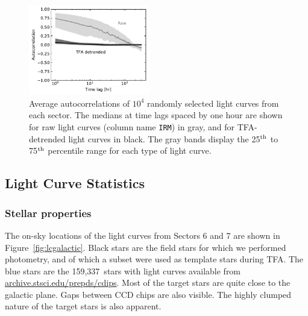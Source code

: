 \documentclass[12pt,twocolumn,tighten]{aastex62}
\newcommand{\numberlcs}{159{,}337\ } %
\newcommand{\stscilink}{\url{archive.stsci.edu/prepds/cdips}}
\begin{document}
\begin{figure}[!t]
	\begin{center}
		\leavevmode
		\includegraphics[width=0.47\textwidth]{avg_acf.pdf}
	\end{center}
	\vspace{-0.5cm}
  \caption{
    Average autocorrelations of $10^4$ randomly selected light curves
    from each sector.  The medians at time lags spaced by one hour are
    shown for raw light curves (column name \texttt{IRM}) in gray, and
    for TFA-detrended light curves in black.  The gray bands display
    the 25$^{\rm th}$ to 75$^{\rm th}$ percentile range for each type
    of light curve.
  \label{fig:avg_acf}
	}
\end{figure}


\subsection{Light Curve Statistics}
\label{subsec:lcstatistics}

\subsubsection{Stellar properties}

The on-sky locations of the light curves from Sectors 6 and 7 are
shown in Figure~\ref{fig:lcgalactic}.  Black stars are the field stars
for which we performed photometry, and of which a subset were used as
template stars during TFA.  The blue stars are the \numberlcs stars
with light curves available from \stscilink.  Most of the target stars
are quite close to the galactic plane.  Gaps between CCD chips are
also visible.  The highly clumped nature of the target stars is also
apparent.

\end{document}
